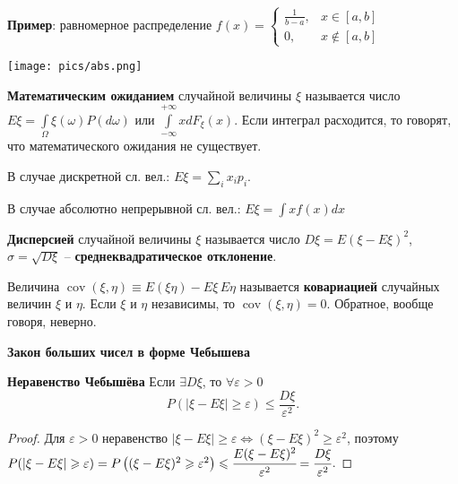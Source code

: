 \textbf{Пример}: равномерное распределение
$f(x) = \begin{cases}\frac{1}{b - a},& x\in[a,b]\\ 0,& x\notin[a,b] \end{cases}$

\texttt{[image: pics/abs.png]}


\textbf{Математическим ожиданием} случайной величины $\xi$ называется число $E\xi = \int\limits_{\Omega} \xi(\omega) P(d\omega)$ или $\int\limits_{-\infty}^{+\infty} x dF_{\xi}(x)$.
Если интеграл расходится, то говорят, что математического ожидания не существует.

В случае дискретной сл. вел.: $E\xi = \displaystyle\sum_{i} x_i p_i$.

В случае абсолютно непрерывной сл. вел.: $E\xi = \int x f(x) dx$

\textbf{Дисперсией} случайной величины $\xi$ называется число $D\xi = E(\xi - E\xi)^2$, $\sigma = \sqrt{D \xi}$ -- \textbf{среднеквадратическое отклонение}.

Величина $\operatorname{cov}(\xi, \eta) \equiv E (\xi \eta)-E \xi \, E \eta$ называется \textbf{ковариацией} случайных величин $\xi$ и $\eta$. Если $\xi$ и $\eta$ независимы, то $\operatorname{cov}(\xi, \eta) = 0$. Обратное, вообще говоря, неверно.


\centerline{\textbf{Закон больших чисел в форме Чебышева}}

\textbf{Неравенство Чебышёва}
Если $\exists D\xi$, то $\forall \varepsilon > 0$
\begin{equation*}
    P(|\xi-E \xi| \geqslant \varepsilon) \leqslant \frac{D \xi}{\varepsilon^{2}}.
\end{equation*}


\begin{proof}
    Для $\varepsilon > 0$ неравенство $|\xi - E \xi| \geqslant \varepsilon \iff (\xi - E \xi)^2 \geqslant \varepsilon^2$, поэтому $P(|\xi-E \xi| \geqslant \varepsilon) = 
        P\left((\xi-E \xi)^{2} \geqslant \varepsilon^{2}\right) \leqslant 
        \cfrac{E (\xi-E \xi)^{2}}{\varepsilon^{2}} =
        \cfrac{D \xi}{\varepsilon^{2}}$.
\end{proof}

